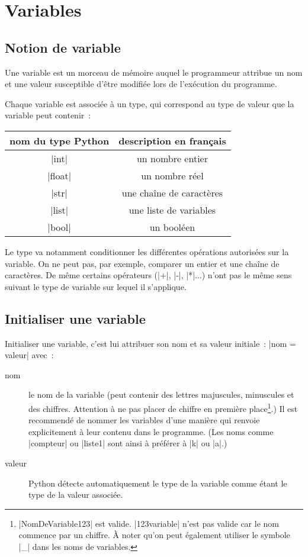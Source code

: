 \section{Variables}

	\subsection{Notion de variable}
		
		Une variable est un morceau de mémoire auquel le programmeur attribue un nom et une valeur susceptible d'être modifiée lors de l'exécution du programme.
		
		Chaque variable est associée à un type, qui correspond au type de valeur que la variable peut contenir~: \\
		
		\begin{tabular}{|c|c|} \hline
			nom du type Python & description en français \\ \hline \hline
			\python|int| & un nombre entier \\ \hline
			\python|float| & un nombre réel \\ \hline
			\python|str| & une chaîne de caractères \\ \hline
			\python|list| & une liste de variables \\ \hline
			\python|bool| & un booléen \\ \hline
		\end{tabular}
		
		Le type va notamment conditionner les différentes opérations autorisées sur la variable.
		On ne peut pas, par exemple, comparer un entier et une chaîne de caractères. De même certains opérateurs (\python|+|, \python|-|, \python|*|$\ldots$) n'ont pas le même sens suivant le type de variable sur lequel il s'applique. \\
		
	\subsection{Initialiser une variable}
		
		Initialiser une variable, c'est lui attribuer son nom et sa valeur initiale~: \python|nom = valeur| avec~:
		\begin{description}
			\item[nom] le nom de la variable (peut contenir des lettres majuscules, minuscules et des chiffres.
			Attention à ne pas placer de chiffre en première place\footnote{\python|NomDeVariable123| est valide. \python|123variable| n'est pas valide car le nom commence par un chiffre. À noter qu'on peut également utiliser le symbole \python|_| dans les noms de variables.}.)
			Il est recommendé de nommer les variables d'une manière qui renvoie explicitement à leur contenu dans le programme. (Les noms comme \python|compteur| ou \python|liste1| sont ainsi à préférer à \python|k| ou \python|a|.)
			\item[valeur] Python détecte automatiquement le type de la variable comme étant le type de la valeur associée.
		\end{description}
		
